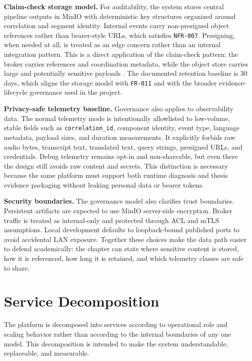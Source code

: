 \textbf{Claim-check storage model.} For auditability, the system stores central pipeline outputs in MinIO with deterministic key structures organized around correlation and segment identity. Internal events carry non-presigned object references rather than bearer-style URLs, which satisfies \texttt{NFR-007}. Presigning, when needed at all, is treated as an edge concern rather than an internal integration pattern. This is a direct application of the claim-check pattern: the broker carries references and coordination metadata, while the object store carries large and potentially sensitive payloads \cite{hohpe2004enterprise}. The documented retention baseline is 30 days, which aligns the storage model with \texttt{FR-011} and with the broader evidence-lifecycle governance used in the project.

\textbf{Privacy-safe telemetry baseline.} Governance also applies to observability data. The normal telemetry mode is intentionally allowlisted to low-volume, stable fields such as \texttt{correlation\_id}, component identity, event type, language metadata, payload sizes, and duration measurements. It explicitly forbids raw audio bytes, transcript text, translated text, query strings, presigned URLs, and credentials. Debug telemetry remains opt-in and non-shareable, but even there the design still avoids raw content and secrets. This distinction is necessary because the same platform must support both runtime diagnosis and thesis evidence packaging without leaking personal data or bearer tokens.

\textbf{Security boundaries.} The governance model also clarifies trust boundaries. Persistent artifacts are expected to use MinIO server-side encryption. Broker traffic is treated as internal-only and protected through ACL and mTLS assumptions. Local development defaults to loopback-bound published ports to avoid accidental LAN exposure. Together these choices make the data path easier to defend academically: the chapter can state where sensitive content is stored, how it is referenced, how long it is retained, and which telemetry classes are safe to share.

\section{Service Decomposition}
\label{sec:service_decomposition}

The platform is decomposed into services according to operational role and scaling behavior rather than according to the internal boundaries of any one model. This decomposition is intended to make the system understandable, replaceable, and measurable.

